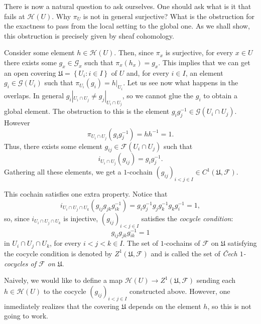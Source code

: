     There is now a natural question to ask ourselves. One should ask what is it that fails at $\mathcal{H}(U)$. Why $\pi_U$ is not in general surjective? What is the obstruction for the exactness to pass from the local setting to the global one. As we shall show, this obstruction is precisely given by sheaf cohomology.

    Consider some element $h\in \mathcal{H}(U)$. Then, since $\pi_x$ is surjective, for every $x\in U$ there exists some $g_x \in \mathcal{G}_x$ such that $\pi_x(h_x)=g_x$. This implies that we can get an open covering $\mathfrak{U}=\left\{ U_i: i \in I \right\}$ of $U$ and, for every $i \in I$, an element $g_i \in \mathcal{G}(U_i)$ such that $\pi_{U_i}(g_i)=h|_{U_i}$. Let us see now what happens in the overlaps. In general $g_i|_{U_i\cap U_j} \neq g_j|_{U_i\cap U_j}$, so we cannot glue the $g_i$ to obtain a global element. The obstruction to this is the element $g_i g_j^{-1} \in \mathcal{G}(U_i \cap U_j)$. However
    \begin{equation*}
      \pi_{U_i \cap U_j}(g_ig_j^{-1})=hh^{-1} = 1.
    \end{equation*}
    Thus, there exists some element $g_{ij} \in \mathcal{F}(U_i\cap U_j)$ such that $$i_{U_i\cap U_j}(g_{ij})=g_ig_j^{-1}.$$
    Gathering all these elements, we get a $1$-cochain $(g_{ij})_{i<j\in I} \in C^1(\mathfrak{U},\mathcal{F})$.
    
    This cochain satisfies one extra property. Notice that
    \begin{equation*}
      i_{U_i\cap U_j\cap U_k}(g_{ij} g_{jk} g_{ik}^{-1})=g_i g_j^{-1} g_j g_k^{-1} g_k g_i^{-1}= 1,
    \end{equation*}
    so, since $i_{U_i \cap U_j \cap U_k}$ is injective, $(g_{ij})_{i<j \in I}$ satisfies the \emph{cocycle condition}:
    \begin{equation*}
      g_{ij} g_{jk} g_{ik}^{-1} = 1
    \end{equation*}
    in $U_i\cap U_j \cap U_k$, for every $i<j<k \in I$. The set of $1$-cochains of $\mathcal{F}$ on $\mathfrak{U}$ satisfying the cocycle condition is denoted by $Z^1(\mathfrak{U},\mathcal{F})$ and is called the set of \emph{\v{C}ech $1$-cocycles of $\mathcal{F}$ on $\mathfrak{U}$}. 

    Naively, we would like to define a map $\mathcal{H}(U) \rightarrow Z^1(\mathfrak{U},\mathcal{F})$ sending each $h\in \mathcal{H}(U)$ to the cocycle $(g_{ij})_{i<j \in I}$ constructed above. However, one inmediately realizes that the covering $\mathfrak{U}$ depends on the element $h$, so this is not going to work.

